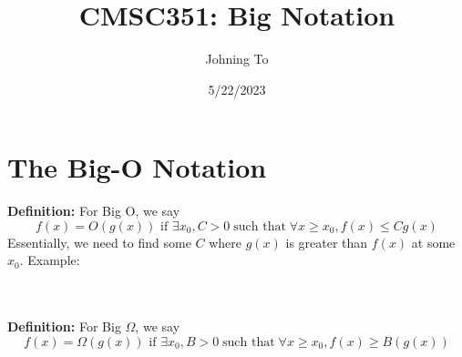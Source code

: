 \documentclass{article}
\title{CMSC351: Big Notation}
\author{Johning To}
\date{5/22/2023}
\begin{document}
\maketitle

\section{The Big-O Notation}

\textbf {Definition:}
For Big O, we say
$$ f(x) = O(g(x)) \text { if } \exists x_0, C > 0 \; \text {such that} \; \forall x \ge x_0, f(x) \le Cg(x) $$
Essentially, we need to find some $ C $ where $ g(x) $ is greater than $ f(x) $ at some $ x_0 $.
Example: 

\\ \\
\textbf {Definition:}
For Big $ \Omega $, we say
$$ f(x) = \Omega(g(x)) \text { if } \exists x_0, B > 0 \; \text {such that} \; \forall x \ge x_0, f(x) \ge B(g(x)) $$
\end{document}
